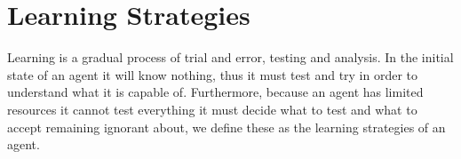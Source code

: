 \documentclass[../Master.tex]{subfiles}
\begin{document}
	\begin{comment}

	    \section*{Sec1}

	    Learning has two important steps to it, the first is figuring out
	    what to do in order to learn about something and the second is analysis
	    of what occured to understand and actually learn about it.


	    Analysing an outcome is about figuring out what occured and what did
	    not occur. For instance if one pressed

	    In a STRIPS domain, all actions are absolute thus we know that if
	    an action changed the state then the action's preconditions was satisfied
	    and all predicates added
    \end{comment}



    \section*{Learning Strategies} \label{sec:strats}

    Learning is a gradual process of trial and error, testing and analysis.
    In the initial state of an agent it will know nothing, thus it must
    test and try in order to understand what it is capable of. Furthermore, because an agent has limited resources it cannot test everything it must decide what to test and what to accept remaining ignorant about, we define these as the learning strategies of an agent.
\end{document}
